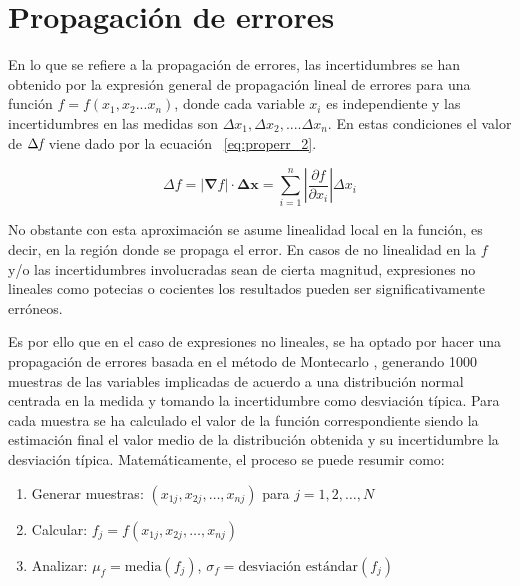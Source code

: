 \section{Propagación de errores}

En lo que se refiere a la propagación de errores, las incertidumbres se han obtenido por la expresión general de propagación lineal de errores para una función $f=f(x_1,x_2...x_n)$, donde cada variable $x_i$  es independiente y las incertidumbres en las medidas son $\Delta x_1, \Delta x_2,....\Delta x_n$. En estas condiciones el valor de $\Delta \emph{f}$ viene dado por la ecuación ~\ref{eq:properr_2}. 

\begin{equation}\label{eq:properr_2}
	{\Delta f} = \left|\mathbf{\nabla}f\right|\cdot\mathbf{\Delta x} =  \sum_{i=1}^{n}\left|\frac{\partial f}{\partial x_i}\right|\Delta x_i
\end{equation}

\vspace{\baselineskip}

No obstante con esta aproximación se asume linealidad local en la función, es decir, en la región donde se propaga el error. En casos de no linealidad en la $f$ y/o las incertidumbres involucradas sean de cierta magnitud, expresiones no lineales como potecias o cocientes los resultados pueden ser significativamente erróneos.

\clearpage

Es por ello  que en el  caso de expresiones no lineales, se ha optado por hacer una propagación de errores basada en el método de Montecarlo \cite{Anderson_montecarlo_1}, generando 1000 muestras de las variables implicadas de acuerdo a una distribución normal centrada en la medida y tomando la incertidumbre como desviación típica.  Para cada muestra se ha calculado el valor de la función correspondiente siendo la estimación final el valor medio de la distribución obtenida y su incertidumbre la desviación típica. Matemáticamente, el proceso se puede resumir como:

\begin{enumerate}
	\item Generar muestras: \((x_{1j}, x_{2j}, \ldots, x_{nj})\) para \(j = 1, 2, \ldots, N\)
	\item Calcular: \(f_j = f(x_{1j}, x_{2j}, \ldots, x_{nj})\)
	\item Analizar: \(\mu_f = \text{media}(f_j)\), \(\sigma_f = \text{desviación estándar}(f_j)\)
\end{enumerate}

